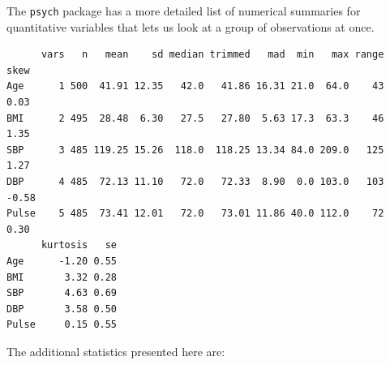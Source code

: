 \documentclass[
]{book}
\newenvironment{Shaded}{\begin{snugshade}}{\end{snugshade}}
\newcommand{\KeywordTok}[1]{\textcolor[rgb]{0.13,0.29,0.53}{\textbf{#1}}}
\newcommand{\NormalTok}[1]{#1}
\newcommand{\OperatorTok}[1]{\textcolor[rgb]{0.81,0.36,0.00}{\textbf{#1}}}
\newcommand{\StringTok}[1]{\textcolor[rgb]{0.31,0.60,0.02}{#1}}
\begin{document}
The \texttt{psych} package has a more detailed list of numerical summaries for quantitative variables that lets us look at a group of observations at once.

\begin{Shaded}
\end{Shaded}

\begin{verbatim}
      vars   n   mean    sd median trimmed   mad  min   max range  skew
Age      1 500  41.91 12.35   42.0   41.86 16.31 21.0  64.0    43  0.03
BMI      2 495  28.48  6.30   27.5   27.80  5.63 17.3  63.3    46  1.35
SBP      3 485 119.25 15.26  118.0  118.25 13.34 84.0 209.0   125  1.27
DBP      4 485  72.13 11.10   72.0   72.33  8.90  0.0 103.0   103 -0.58
Pulse    5 485  73.41 12.01   72.0   73.01 11.86 40.0 112.0    72  0.30
      kurtosis   se
Age      -1.20 0.55
BMI       3.32 0.28
SBP       4.63 0.69
DBP       3.58 0.50
Pulse     0.15 0.55
\end{verbatim}

The additional statistics presented here are:
\end{document}
